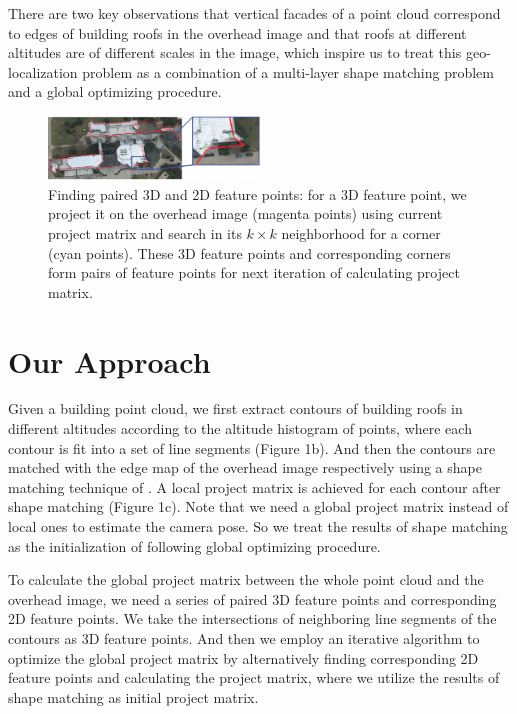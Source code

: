 There are two key observations that vertical facades of a point cloud correspond to edges of building roofs in the overhead image and that roofs at different altitudes are of different scales in the image, which inspire us to treat this geo-localization problem as a combination of a multi-layer shape matching problem and a global optimizing procedure. 
%
\begin{figure}
	\centering
	\vspace{2.0cm}
	\includegraphics[width=0.5\textwidth]{figures/details_png}
	\caption{Finding paired 3D and 2D feature points: for a 3D feature point, we project it on the overhead image (magenta points) using current project matrix and search in its $k\times k$ neighborhood for a corner (cyan points). These 3D feature points and corresponding corners form pairs of feature points for next iteration of calculating project matrix.}
	\label{fig:overview}
\end{figure}
\section{Our Approach}
Given a building point cloud, we first extract contours of building roofs in different altitudes according to the altitude histogram of points, where each contour is fit into a set of line segments (Figure 1b). And then the contours are matched with the edge map of the overhead image respectively using a shape matching technique of \cite{FDCM}. A local project matrix is achieved for each contour after shape matching (Figure 1c). Note that we need a global project matrix instead of local ones to estimate the camera pose. So we treat the results of shape matching as the initialization of following global optimizing procedure. 

To calculate the global project matrix between the whole point cloud and the overhead image, we need a series of paired 3D feature points and corresponding 2D feature points. We take the intersections of neighboring line segments of the contours as 3D feature points. And then we employ an iterative algorithm to optimize the global project matrix by alternatively finding corresponding 2D feature points and calculating the project matrix, where we utilize the results of shape matching as initial project matrix.

